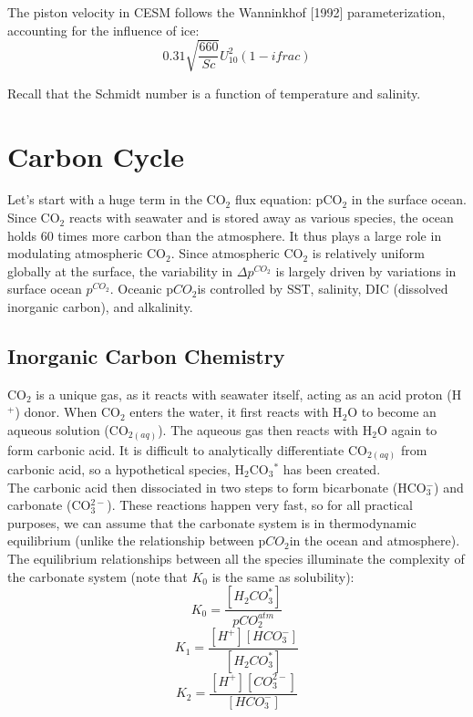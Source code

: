 \documentclass[12pt]{article}
\newcommand{\pco}{p$CO_{2}$}
\newcommand{\bicarb}{HCO$_{3}^{-}$}
\newcommand{\carb}{CO$_{3}^{2-}$}
\begin{document}
The piston velocity in CESM follows the Wanninkhof [1992] parameterization, accounting for the influence of ice:
$$
	0.31\sqrt{\frac{660}{Sc}}U^{2}_{10}(1 - ifrac)
$$

Recall that the Schmidt number is a function of temperature and salinity. \\

\section{Carbon Cycle}
Let's start with a huge term in the CO$_{2}$ flux equation: pCO$_{2}$ in the surface ocean. Since CO$_{2}$ reacts with seawater and is stored away as various species, the ocean holds 60 times more carbon than the atmosphere. It thus plays a large role in modulating atmospheric CO$_{2}$. Since atmospheric CO$_{2}$ is relatively uniform globally at the surface, the variability in $\Delta p^{CO_{2}}$ is largely driven by variations in surface ocean $p^{CO_{2}}$. Oceanic \pco is controlled by SST, salinity, DIC (dissolved inorganic carbon), and alkalinity. \\

\subsection{Inorganic Carbon Chemistry}
CO$_{2}$ is a unique gas, as it reacts with seawater itself, acting as an acid proton (H$^{+}$) donor. When CO$_{2}$ enters the water, it first reacts with H$_{2}$O to become an aqueous solution (CO$_{2(aq)}$). The aqueous gas then reacts with H$_{2}$O again to form carbonic acid. It is difficult to analytically differentiate CO$_{2(aq)}$ from carbonic acid, so a hypothetical species, H$_{2}$CO$_{3}$$^{\ast}$ has been created.	\\

The carbonic acid then dissociated in two steps to form bicarbonate (\bicarb) and carbonate (\carb). These reactions happen very fast, so for all practical purposes, we can assume that the carbonate system is in thermodynamic equilibrium (unlike the relationship between \pco in the ocean and atmosphere). \\

The equilibrium relationships between all the species illuminate the complexity of the carbonate system (note that $K_{0}$ is the same as solubility):
$$
K_{0} = \frac{[H_{2}CO_{3}^{\ast}]}{pCO_{2}^{atm}}
$$
$$
K_{1} = \frac{[H^{+}][HCO_{3}^{-}]}{[H_{2}CO_{3}^{\ast}]}
$$
$$
K_{2} = \frac{[H^{+}][CO_{3}^{2-}]}{[HCO_{3}^{-}]}
$$
\end{document}
